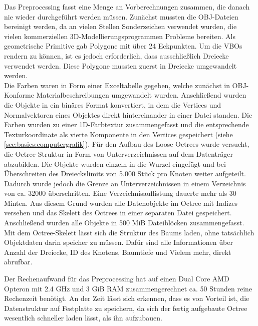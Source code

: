 Das Preprocessing fasst eine Menge an Vorberechnungen zusammen, die danach nie wieder durchgeführt werden müssen. Zunächst mussten die OBJ-Dateien bereinigt werden, da an vielen Stellen Sonderzeichen verwendet wurden, die vielen kommerziellen 3D-Modellierungsprogrammen Probleme bereiten. Als geometrische Primitive gab Polygone mit über 24 Eckpunkten. Um die VBOs rendern zu können, ist es jedoch erforderlich, dass ausschließlich Dreiecke verwendet werden. Diese Polygone mussten zuerst in Dreiecke umgewandelt werden. \\
Die Farben waren in Form einer Exceltabelle gegeben, welche zunächst in OBJ-Konforme Materialbeschreibungen umgewandelt wurden. Anschließend wurden die Objekte in ein binäres Format konvertiert, in dem die Vertices und Normalvektoren eines Objektes direkt hintereinander in einer Datei standen. Die Farben wurden zu einer 1D-Farbtextur zusammengefasst und die entsprechende Texturkoordinate als vierte Komponente in den Vertices gespeichert (siehe \ref{sec:basics:computergrafik}). Für den Aufbau des Loose Octrees wurde versucht, die Octree-Struktur in Form von Unterverzeichnissen auf dem Datenträger abzubilden. Die Objekte wurden einzeln in die Wurzel eingefügt und bei Überschreiten des Dreieckslimits von 5.000 Stück pro Knoten weiter aufgeteilt. Dadurch wurde jedoch die Grenze an Unterverzeichnissen in einem Verzeichnis von ca. 32000 überschritten. Eine Verzeichnisauflistung dauerte mehr als 30 Minten. Aus diesem Grund wurden alle Datenobjekte im Octree mit Indizes versehen und das Skelett des Octrees in einer separaten Datei gespeichert. Anschließend wurden alle Objekte in 500 MiB Dateiblöcken zusammengefasst. Mit dem Octree-Skelett lässt sich die Struktur des Baums laden, ohne tatsächlich Objektdaten darin speicher zu müssen. Dafür sind alle Informationen über Anzahl der Dreiecke, ID des Knotens, Baumtiefe und Vielem mehr, direkt abrufbar.

Der Rechenaufwand für das Preprocessing hat auf einen Dual Core AMD Opteron mit 2.4 GHz und 3 GiB RAM zusammengerechnet ca. 50 Stunden reine Rechenzeit benötigt. An der Zeit lässt sich erkennen, dass es von Vorteil ist, die Datenstruktur auf Festplatte zu speichern, da sich der fertig aufgebaute Octree wesentlich schneller laden lässt, als ihn aufzubauen.

